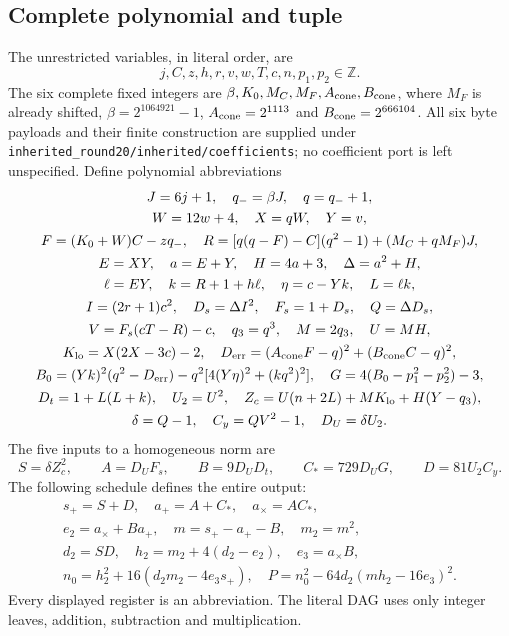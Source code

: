 \subsection{Complete polynomial and tuple}
The unrestricted variables, in literal order, are
\[
 j,C,z,h,r,v,w,T,c,n,p_1,p_2\in\mathbb Z.
\]
The six complete fixed integers are
$\beta,K_0,M_C,M_F,A_{\rm cone},B_{\rm cone}$, where $M_F$ is already shifted,
$\beta=2^{1064921}-1$, $A_{\rm cone}=2^{1113}$ and
$B_{\rm cone}=2^{666104}$. All six byte payloads and their finite construction
are supplied under \texttt{inherited\_round20/inherited/coefficients}; no
coefficient port is left unspecified. Define polynomial abbreviations
\begin{gather*}
 J=6j+1,\quad q_-=\beta J,\quad q=q_-+1,\\
 W=12w+4,\quad X=qW,\quad Y=v,\\
 F=(K_0+W)C-zq_-,\quad 
 R=[q(q-F)-C](q^2-1)+(M_C+qM_F)J,\\
 E=XY,\quad a=E+Y,\quad H=4a+3,\quad \Delta=a^2+H,\\
 \ell=EY,\quad k=R+1+h\ell,\quad \eta=c-Yk,\quad L=\ell k,\\
 I=(2r+1)c^2,\quad D_s=\Delta I^2,\quad F_s=1+D_s,\quad Q=\Delta D_s,\\
 V=F_s(cT-R)-c,\quad q_3=q^3,\quad M=2q_3,\quad U=MH,\\
 K_{\rm lo}=X(2X-3c)-2,\quad 
 D_{\rm err}=(A_{\rm cone}F-q)^2+(B_{\rm cone}C-q)^2,\\
 B_0=(Yk)^2(q^2-D_{\rm err})
      -q^2[4(Y\eta)^2+(kq^2)^2],\quad 
 G=4(B_0-p_1^2-p_2^2)-3,\\
 D_t=1+L(L+k),\quad U_2=U^2,\quad 
 Z_c=U(n+2L)+MK_{\rm lo}+H(Y-q_3),\\
 \delta=Q-1,\quad C_y=QV^2-1,\quad D_U=\delta U_2.
\end{gather*}
The five inputs to a homogeneous norm are
\[
 S=\delta Z_c^2,\qquad A=D_UF_s,\qquad B=9D_UD_t,
 \qquad C_*=729D_UG,\qquad D=81U_2C_y.
\]
The following schedule defines the entire output:
\begin{gather*}
 s_+=S+D,\quad a_+=A+C_*,\quad a_\times=AC_*,\\
 e_2=a_\times+Ba_+,\quad m=s_+-a_+-B,\quad m_2=m^2,\\
 d_2=SD,\quad h_2=m_2+4(d_2-e_2),\quad e_3=a_\times B,\\
 n_0=h_2^2+16(d_2m_2-4e_3s_+),\quad 
 \boxed{P=n_0^2-64d_2(mh_2-16e_3)^2.}
\end{gather*}
Every displayed register is an abbreviation. The literal DAG uses only
integer leaves, addition, subtraction and multiplication.

